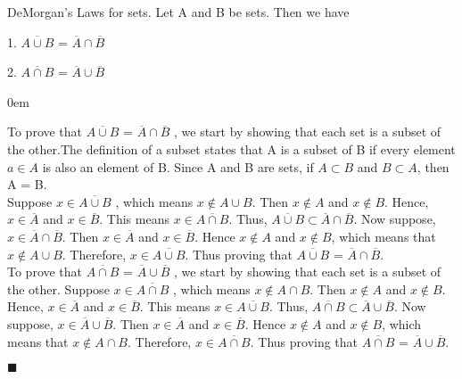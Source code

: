 \documentclass[12pt]{article}
\renewcommand{\qed}{\hfill$\blacksquare$}
\renewenvironment{proof}{\begin{addmargin}[1em]{0em}\begin{newproof}}{\end{newproof}\end{addmargin}\qed}
\newenvironment{theorem}[2][Theorem]{\begin{trivlist}
\item[\hskip \labelsep {\bfseries #1}\hskip \labelsep {\bfseries #2.}]}{\end{trivlist}}
\begin{document}
\rhead{\today}


\begin{theorem}{2.3} %
DeMorgan's Laws for sets. Let A and B be sets. Then we have

1. $\overline{A \cup B}$ = $\overline{A} \cap \overline{B}$

2. $\overline{A \cap B}$ = $\overline{A} \cup \overline{B}$

\end{theorem}

\begin{proof}


	To prove that $\overline{A \cup B}$ = $\overline{A} \cap \overline{B}$ , we start by showing that each set is a subset of the other.The definition of a subset states that A is a subset of B if every element $a \in A$ is also an element of B. Since A and B are sets, if $A \subset B$ and $B \subset A$, then A = B. \\

    Suppose $x \in \overline{A \cup B}$ , which means $x \notin A \cup B$. Then $x \notin A$ and $x \notin B$. Hence, $x \in \overline{A}$ and $x \in \overline{B}$. This means $x \in \overline{A \cap B}$. Thus, $\overline{A \cup B} \subset \overline{A} \cap \overline{B}$. Now suppose, $x \in \overline{A} \cap \overline{B}$. Then $x \in \overline{A}$ and $x \in \overline{B}$. Hence $x \notin A$ and $x \notin B$, which means that $x \notin A \cup B$. Therefore, $x \in \overline{A \cup B}$. Thus proving that $\overline{A \cup B}$ = $\overline{A} \cap \overline{B}$.\\

	To prove that $\overline{A \cap B}$ = $\overline{A} \cup \overline{B}$ , we start by showing that each set is a subset of the other. Suppose $x \in \overline{A \cap B}$ , which means $x \notin A \cap B$. Then $x \notin A$ and $x \notin B$. Hence, $x \in \overline{A}$ and $x \in \overline{B}$. This means $x \in \overline{A \cup B}$. Thus, $\overline{A \cap B} \subset \overline{A} \cup \overline{B}$. Now suppose, $x \in \overline{A} \cup \overline{B}$. Then $x \in \overline{A}$ and $x \in \overline{B}$. Hence $x \notin A$ and $x \notin B$, which means that $x \notin A \cap B$. Therefore, $x \in \overline{A \cap B}$. Thus proving that $\overline{A \cap B}$ = $\overline{A} \cup \overline{B}$.

\end{proof}
\end{document}
